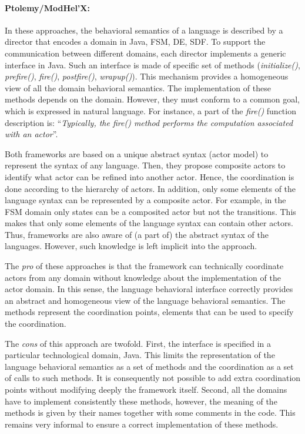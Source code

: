 \paragraph{Ptolemy/ModHel'X: }
In these approaches, the behavioral semantics of a language is described by a director that encodes a domain in Java, \eg FSM, DE, SDF. To support the communication between different domains, each director implements a generic interface in Java. Such an interface is made of specific set of methods (\eg \emph{initialize()}, \emph{prefire()}, \emph{fire()}, \emph{postfire()}, \emph{wrapup()}). This mechanism provides a homogeneous view of all the domain behavioral semantics. The implementation of these methods depends on the domain. However, they must conform to a common goal, which is expressed in natural language. For instance, a part of the \emph{fire()} function description is: ``\emph{Typically, the fire() method performs the computation associated with an actor}''. 

Both frameworks are based on a unique abstract syntax (\ie actor model) to represent the syntax of any language. Then, they propose composite actors to identify what actor can be refined into another actor. Hence, the coordination is done according to the hierarchy of actors. In addition, only some elements of the language syntax can be represented by a composite actor. For example, in the FSM domain only states can be a composited actor but not the transitions. This makes that only some elements of the language syntax can contain other actors. Thus, frameworks are also aware of (a part of) the abstract syntax of the languages. However, such knowledge is left implicit into the approach.

The \emph{pro} of these approaches is that the framework can technically coordinate actors from any domain without knowledge about the implementation of the actor domain. In this sense, the language behavioral interface correctly provides an abstract and homogeneous view of the language behavioral semantics. The methods represent the coordination points, \ie elements that can be used to specify the coordination. 

The \emph{cons} of this approach are twofold. First, the interface is specified in a particular technological domain, \ie Java. This limits the representation of the language behavioral semantics as a set of methods and the coordination as a set of calls to such methods. It is consequently not possible to add extra coordination points without modifying deeply the framework itself. Second, all the domains have to implement consistently these methods, however, the meaning of the methods is given by their names together with some comments in the code. This remains very informal to ensure a correct implementation of these methods.  

